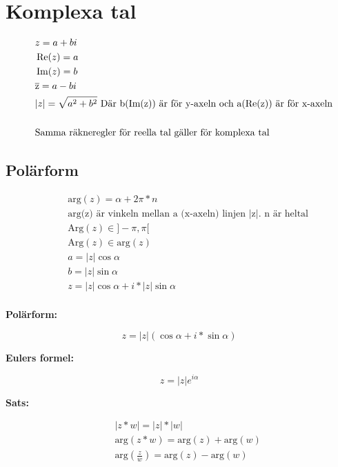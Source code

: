 \section{Komplexa tal}
\begin{align*}
&\quad z = a + bi \\
&\quad \operatorname{Re}(z) = a \\
&\quad \operatorname{Im}(z) = b \\
&\quad \overline{\rm z}= a - b i \\
&\quad | z | = \sqrt{a^ { 2 } + b^ { 2 }} \text{  Där b(Im(z)) är för y-axeln och a(Re(z)) är för x-axeln} \\
&\quad  \\
&\quad \text{Samma räkneregler för reella tal gäller för komplexa tal} \\
\end{align*}


\subsection{Polärform}
\begin{align*}
  &\quad \text{arg}(z) = \alpha + 2\pi * n \\
  &\quad \text{arg(z) är vinkeln mellan a (x-axeln) linjen |z|. n är heltal}  \\
  &\quad \text{Arg}(z) \in ]-\pi, \pi[ \\
    &\quad \text{Arg}(z) \in \text{arg}(z) \\
    &\quad a = |z| \cos{\alpha} \\
    &\quad b = |z| \sin{\alpha} \\
    &\quad z = |z| \cos{\alpha} + i * |z| \sin{\alpha} \\
\end{align*}

\textbf{Polärform:}\par
\begin{equation}
  z = |z|(\cos{\alpha} + i * \sin{\alpha})
\end{equation}

\textbf{Eulers formel:}\par
\begin{equation}
  z = |z|e^{i \alpha}
\end{equation}

\textbf{Sats:}\par
\begin{align*}
  &\quad |z * w| = |z| * |w| \\
  &\quad \text{arg}(z * w) = \text{arg}(z) + \text{arg}(w) \\
  &\quad \text{arg}(\frac{z}{w}) =  \text{arg}(z) - \text{arg}(w)\\
\end{align*}

